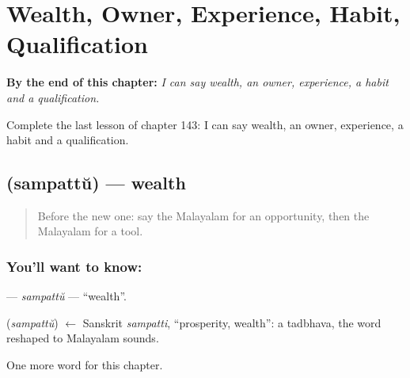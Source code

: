 
\chapter{Wealth, Owner, Experience, Habit, Qualification}
\label{ch:ml-wealth-owner-experience-habit-qualification}

\begin{chapteropening}
\textbf{By the end of this chapter:} \emph{I can say wealth, an owner, experience, a habit and a qualification.}

Complete the last lesson of chapter 143: I can say wealth, an owner, experience, a habit and a qualification.
\end{chapteropening}

\section[\texorpdfstring{\ml{സമ്പത്ത്} (sampattŭ)}{സമ്പത്ത് (sampattŭ)}]{ (sampattŭ) — wealth}

\label{lesson:ML-C143-sampattu}



\begin{quote}
Before the new one: say the Malayalam for an opportunity, then the Malayalam for a tool.
\end{quote}

\subsection*{You'll want to know: }
\textbf{} — \emph{sampattŭ} — \textquotedblleft{}wealth\textquotedblright{}.

\begin{cousinweb}
\textbf{} (\emph{sampattŭ}) $\leftarrow$ Sanskrit \emph{sampatti}, \textquotedblleft{}prosperity, wealth\textquotedblright{}: a tadbhava, the word reshaped to Malayalam sounds.
\end{cousinweb}

\begin{grammarlens}[title={What you've built}]
One more word for this chapter.
\end{grammarlens}

